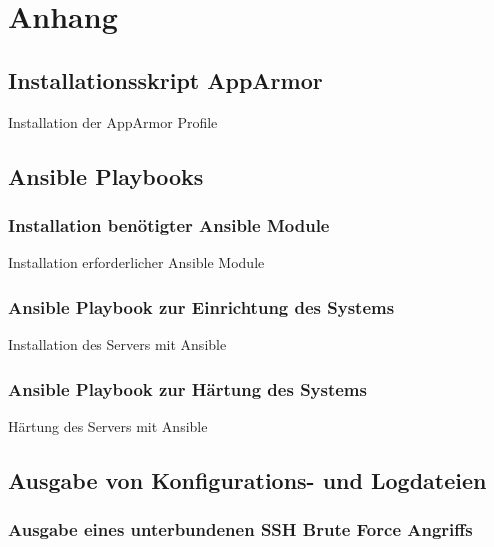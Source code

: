 \section{Anhang}

\subsection{Installationsskript AppArmor}

\begin{listing}[ht]{}
    \caption{Installation der AppArmor Profile}
    \label{listing:installation_apparmor}
\end{listing}

\subsection{Ansible Playbooks}

\subsubsection{Installation benötigter Ansible Module}
\begin{listing}
    \caption{Installation erforderlicher Ansible Module}
    \label{listing:ansible_module_installation}
\end{listing}


\subsubsection{Ansible Playbook zur Einrichtung des Systems}
\begin{longlisting}
    \caption{Installation des Servers mit Ansible}
    \label{listing:ansible_playbook}
\end{longlisting}

\subsubsection{Ansible Playbook zur Härtung des Systems}
\begin{longlisting}
    \caption{Härtung des Servers mit Ansible}
    \label{listing:hardening}
\end{longlisting}

\subsection{Ausgabe von Konfigurations- und Logdateien}

\subsubsection{Ausgabe eines unterbundenen SSH Brute Force Angriffs}
\inputminted[breaklines=true,firstline=34, lastline=42]{text}{code/output/sshguard.txt}
